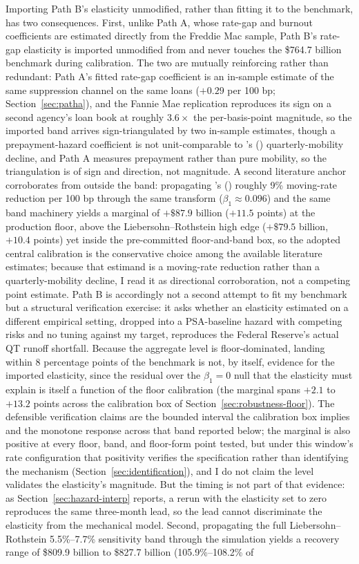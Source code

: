 \documentclass[12pt]{article}
\newcommand{\citepos}[1]{\citeauthor{#1}'s (\citeyear{#1})}
\begin{document}
Importing Path B's elasticity unmodified, rather than fitting it to the benchmark, has two consequences. First, unlike Path A, whose rate-gap and burnout coefficients are estimated directly from the Freddie Mac sample, Path B's rate-gap elasticity is imported unmodified from \citet{liebersohn2024} and never touches the \$764.7 billion benchmark during calibration. The two are mutually reinforcing rather than redundant: Path A's fitted rate-gap coefficient is an in-sample estimate of the same suppression channel on the same loans ($+0.29$ per 100 bp; Section~\ref{sec:patha}), and the Fannie Mae replication reproduces its sign on a second agency's loan book at roughly $3.6\times$ the per-basis-point magnitude, so the imported band arrives sign-triangulated by two in-sample estimates, though a prepayment-hazard coefficient is not unit-comparable to \citepos{liebersohn2024} quarterly-mobility decline, and Path A measures prepayment rather than pure mobility, so the triangulation is of sign and direction, not magnitude. A second literature anchor corroborates from outside the band: propagating \citepos{fonseca2024} roughly 9\% moving-rate reduction per 100 bp through the same transform ($\beta_1 \approx 0.096$) and the same band machinery yields a marginal of $+\$87.9$ billion ($+11.5$ points) at the production floor, above the Liebersohn--Rothstein high edge ($+\$79.5$ billion, $+10.4$ points) yet inside the pre-committed floor-and-band box, so the adopted central calibration is the conservative choice among the available literature estimates; because that estimand is a moving-rate reduction rather than a quarterly-mobility decline, I read it as directional corroboration, not a competing point estimate. Path B is accordingly not a second attempt to fit my benchmark but a structural verification exercise: it asks whether an elasticity estimated on a different empirical setting, dropped into a PSA-baseline hazard with competing risks and no tuning against my target, reproduces the Federal Reserve's actual QT runoff shortfall. Because the aggregate level is floor-dominated, landing within 8 percentage points of the benchmark is not, by itself, evidence for the imported elasticity, since the residual over the $\beta_1 = 0$ null that the elasticity must explain is itself a function of the floor calibration (the marginal spans $+2.1$ to $+13.2$ points across the calibration box of Section~\ref{sec:robustness-floor}). The defensible verification claims are the bounded interval the calibration box implies and the monotone response across that band reported below; the marginal is also positive at every floor, band, and floor-form point tested, but under this window's rate configuration that positivity verifies the specification rather than identifying the mechanism (Section~\ref{sec:identification}), and I do not claim the level validates the elasticity's magnitude. But the timing is not part of that evidence: as Section~\ref{sec:hazard-interp} reports, a rerun with the elasticity set to zero reproduces the same three-month lead, so the lead cannot discriminate the elasticity from the mechanical model. Second, propagating the full Liebersohn--Rothstein 5.5\%--7.7\% sensitivity band through the simulation yields a recovery range of \$809.9 billion to \$827.7 billion (105.9\%--108.2\% of 
\end{document}
